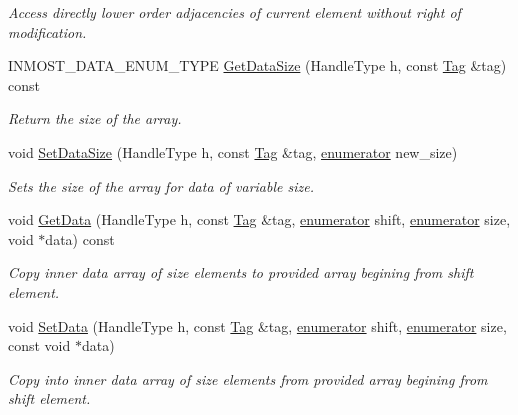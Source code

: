 \begin{DoxyCompactItemize}
\begin{DoxyCompactList}\small\item\em Access directly lower order adjacencies of current element without right of modification. \end{DoxyCompactList}\item 
I\-N\-M\-O\-S\-T\-\_\-\-D\-A\-T\-A\-\_\-\-E\-N\-U\-M\-\_\-\-T\-Y\-P\-E \hyperlink{classINMOST_1_1Mesh_a4a721e7a76dba9bc87c4f014bff013cc}{Get\-Data\-Size} (Handle\-Type h, const \hyperlink{classINMOST_1_1Tag}{Tag} \&tag) const 
\begin{DoxyCompactList}\small\item\em Return the size of the array. \end{DoxyCompactList}\item 
void \hyperlink{classINMOST_1_1Mesh_a8ade9beb68c97be47897b50ce6e4dcb6}{Set\-Data\-Size} (Handle\-Type h, const \hyperlink{classINMOST_1_1Tag}{Tag} \&tag, \hyperlink{classINMOST_1_1Storage_ae333dfced6fa9cfde0c8e7dcf1b0cc2b}{enumerator} new\-\_\-size)
\begin{DoxyCompactList}\small\item\em Sets the size of the array for data of variable size. \end{DoxyCompactList}\item 
void \hyperlink{classINMOST_1_1Mesh_abd9c22bde076d9828752924f1b6cefb1}{Get\-Data} (Handle\-Type h, const \hyperlink{classINMOST_1_1Tag}{Tag} \&tag, \hyperlink{classINMOST_1_1Storage_ae333dfced6fa9cfde0c8e7dcf1b0cc2b}{enumerator} shift, \hyperlink{classINMOST_1_1Storage_ae333dfced6fa9cfde0c8e7dcf1b0cc2b}{enumerator} size, void $\ast$data) const 
\begin{DoxyCompactList}\small\item\em Copy inner data array of size elements to provided array begining from shift element. \end{DoxyCompactList}\item 
void \hyperlink{classINMOST_1_1Mesh_a2e40d1712147e6dc39113d855882743e}{Set\-Data} (Handle\-Type h, const \hyperlink{classINMOST_1_1Tag}{Tag} \&tag, \hyperlink{classINMOST_1_1Storage_ae333dfced6fa9cfde0c8e7dcf1b0cc2b}{enumerator} shift, \hyperlink{classINMOST_1_1Storage_ae333dfced6fa9cfde0c8e7dcf1b0cc2b}{enumerator} size, const void $\ast$data)
\begin{DoxyCompactList}\small\item\em Copy into inner data array of size elements from provided array begining from shift element. \end{DoxyCompactList}\item 

\end{DoxyCompactItemize}
